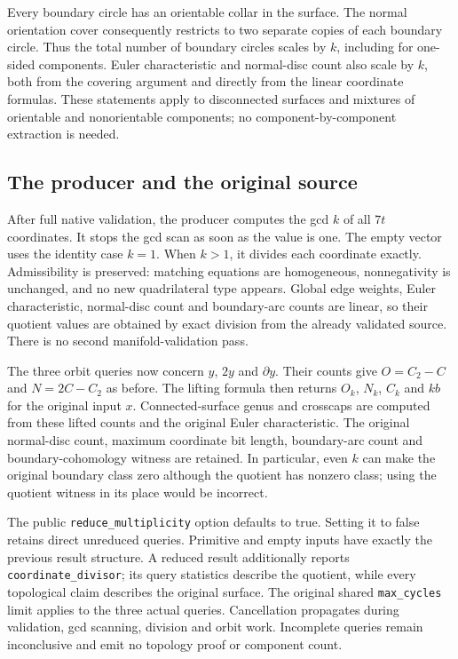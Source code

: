 Every boundary circle has an orientable collar in the surface. The normal
orientation cover consequently restricts to two separate copies of each
boundary circle. Thus the total number of boundary circles scales by $k$,
including for one-sided components. Euler characteristic and normal-disc
count also scale by $k$, both from the covering argument and directly from
the linear coordinate formulas. These statements apply to disconnected
surfaces and mixtures of orientable and nonorientable components; no
component-by-component extraction is needed.

\subsection{The producer and the original source}

After full native validation, the producer computes the gcd $k$ of all
$7t$ coordinates. It stops the gcd scan as soon as the value is one. The
empty vector uses the identity case $k=1$. When $k>1$, it divides each
coordinate exactly. Admissibility is preserved: matching equations are
homogeneous, nonnegativity is unchanged, and no new quadrilateral type
appears. Global edge weights, Euler characteristic, normal-disc count and
boundary-arc counts are linear, so their quotient values are obtained by
exact division from the already validated source. There is no second
manifold-validation pass.

The three orbit queries now concern $y$, $2y$ and $\partial y$. Their
counts give $O=C_2-C$ and $N=2C-C_2$ as before. The lifting formula then
returns $O_k$, $N_k$, $C_k$ and $kb$ for the original input $x$.
Connected-surface genus and crosscaps are computed from these lifted counts
and the original Euler characteristic. The original normal-disc count,
maximum coordinate bit length, boundary-arc count and boundary-cohomology
witness are retained. In particular, even $k$ can make the original
boundary class zero although the quotient has nonzero class; using the
quotient witness in its place would be incorrect.

The public \texttt{reduce\_multiplicity} option defaults to true. Setting
it to false retains direct unreduced queries. Primitive and empty inputs
have exactly the previous result structure. A reduced result additionally
reports \texttt{coordinate\_divisor}; its query statistics describe the
quotient, while every topological claim describes the original surface.
The original shared \texttt{max\_cycles} limit applies to the three actual
queries. Cancellation propagates during validation, gcd scanning, division
and orbit work. Incomplete queries remain inconclusive and emit no topology
proof or component count.

